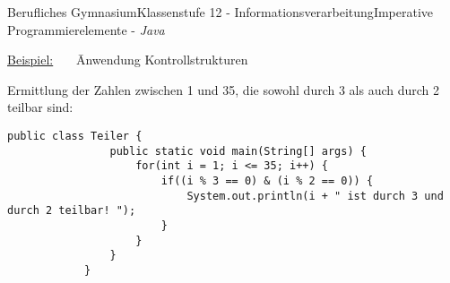 \documentclass[oneside,openany,headings=optiontotoc,11pt,numbers=noenddot]{article}
\begin{document}
\begin{worksheet}{Berufliches Gymnasium}{Klassenstufe 12 - Informationsverarbeitung}{Imperative Programmierelemente - \textit{Java}}
		\par\noindent
		\begin{tabbing}
			\underline{Beispiel:}~~~ \= Anwendung Kontrollstrukturen
		\end{tabbing}
		Ermittlung der Zahlen zwischen 1 und 35, die sowohl durch 3 als auch durch 2 teilbar sind:
		\begin{lstlisting}[style=JavaInputStyle]
			public class Teiler {
				public static void main(String[] args) {
					for(int i = 1; i <= 35; i++) {
						if((i % 3 == 0) & (i % 2 == 0)) {
							System.out.println(i + " ist durch 3 und durch 2 teilbar! ");
						}
					}
				}
			}
		\end{lstlisting}
		
	\end{worksheet}
\end{document}

